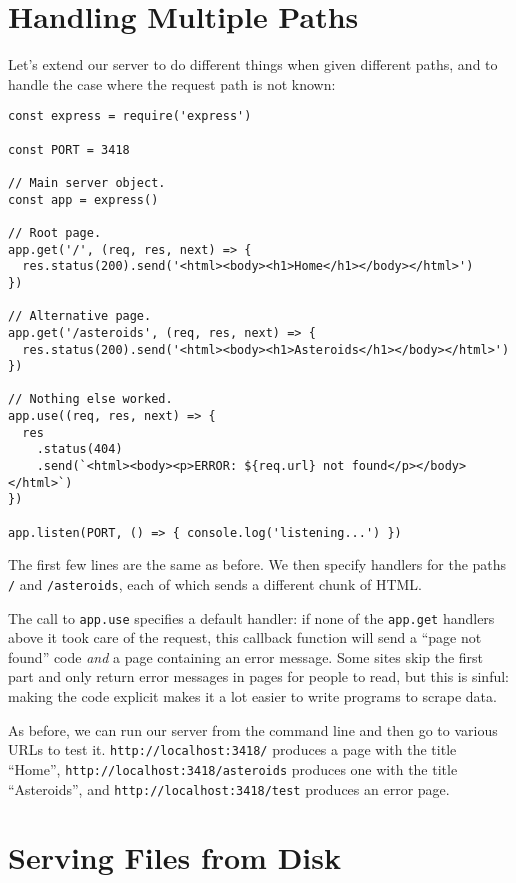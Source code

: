 \section{Handling Multiple Paths}\label{s:server-paths}

Let's extend our server to do different things when given different paths,
and to handle the case where the request path is not known:

\begin{verbatim}
const express = require('express')

const PORT = 3418

// Main server object.
const app = express()

// Root page.
app.get('/', (req, res, next) => {
  res.status(200).send('<html><body><h1>Home</h1></body></html>')
})

// Alternative page.
app.get('/asteroids', (req, res, next) => {
  res.status(200).send('<html><body><h1>Asteroids</h1></body></html>')
})

// Nothing else worked.
app.use((req, res, next) => {
  res
    .status(404)
    .send(`<html><body><p>ERROR: ${req.url} not found</p></body></html>`)
})

app.listen(PORT, () => { console.log('listening...') })
\end{verbatim}

The first few lines are the same as before.
We then specify handlers for the paths \texttt{/} and \texttt{/asteroids},
each of which sends a different chunk of HTML.

The call to \texttt{app.use} specifies a default handler:
if none of the \texttt{app.get} handlers above it took care of the request,
this callback function will send a ``page not found'' code
\emph{and} a page containing an error message.
Some sites skip the first part and only return error messages in pages for people to read,
but this is sinful:
making the code explicit makes it a lot easier to write programs to scrape data.

As before, we can run our server from the command line
and then go to various URLs to test it.
\texttt{http://localhost:3418/} produces a page with the title ``Home'',
\texttt{http://localhost:3418/asteroids} produces one with the title ``Asteroids'',
and \texttt{http://localhost:3418/test} produces an error page.

\section{Serving Files from Disk}\label{s:server-files}

